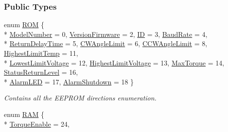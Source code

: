 \subsubsection*{Public Types}
\begin{DoxyCompactItemize}
\item 
enum \hyperlink{a00001_a08d272b502d65464202a3aa97825aec0}{R\+O\+M} \{ \\*
\hyperlink{a00001_a08d272b502d65464202a3aa97825aec0afaeddb6fc62aacc16e88f98a77efbcff}{Model\+Number} = 0, 
\hyperlink{a00001_a08d272b502d65464202a3aa97825aec0a234de9d5194d6b6f4e45b854dbf1442d}{Version\+Firmware} = 2, 
\hyperlink{a00001_a08d272b502d65464202a3aa97825aec0ab2565d5698c9d943a8bcecf02b1389ad}{I\+D} = 3, 
\hyperlink{a00001_a08d272b502d65464202a3aa97825aec0afa8229ff24576bd10b061c259cc1146d}{Baud\+Rate} = 4, 
\\*
\hyperlink{a00001_a08d272b502d65464202a3aa97825aec0a1e7fa07a9a5a28584a287668a95dbb4f}{Return\+Delay\+Time} = 5, 
\hyperlink{a00001_a08d272b502d65464202a3aa97825aec0aae428847c3648681e8aae8f0a12c6880}{C\+W\+Angle\+Limit} = 6, 
\hyperlink{a00001_a08d272b502d65464202a3aa97825aec0ac631a1a4dfb22cd02e863fa19f509523}{C\+C\+W\+Angle\+Limit} = 8, 
\hyperlink{a00001_a08d272b502d65464202a3aa97825aec0aa9f1a3f67a0bf70f6e6530cac9f55153}{Highest\+Limit\+Temp} = 11, 
\\*
\hyperlink{a00001_a08d272b502d65464202a3aa97825aec0a75d2b929c12ad95dfe84b3214e5badd5}{Lowest\+Limit\+Voltage} = 12, 
\hyperlink{a00001_a08d272b502d65464202a3aa97825aec0a39bed5183cada3039894ec459e9cdba4}{Highest\+Limit\+Voltage} = 13, 
\hyperlink{a00001_a08d272b502d65464202a3aa97825aec0aa45ee204b37e8a8657bbb0be1f3f2ee5}{Max\+Torque} = 14, 
\hyperlink{a00001_a08d272b502d65464202a3aa97825aec0a1f50b233b75db417410a9ad75671c5f8}{Status\+Return\+Level} = 16, 
\\*
\hyperlink{a00001_a08d272b502d65464202a3aa97825aec0a69af7afba3f29c206407f802a6975dd1}{Alarm\+L\+E\+D} = 17, 
\hyperlink{a00001_a08d272b502d65464202a3aa97825aec0a017096d92de6aa9fa691df824cd21757}{Alarm\+Shutdown} = 18
 \}
\begin{DoxyCompactList}\small\item\em Contains all the E\+E\+P\+R\+O\+M directions enumeration. \end{DoxyCompactList}\item 
enum \hyperlink{a00001_a672068c48bbee921e5856cc44b1c81c1}{R\+A\+M} \{ \\*
\hyperlink{a00001_a672068c48bbee921e5856cc44b1c81c1ac4597f1de691116b512ae043da6ae7a3}{Torque\+Enable} = 24, 

\end{DoxyCompactItemize}

